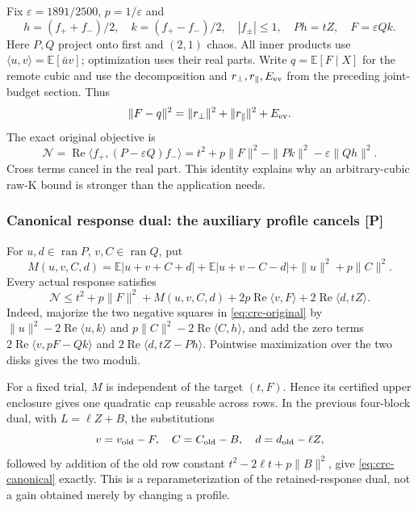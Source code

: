 Fix $\varepsilon=1891/2500$, $p=1/\varepsilon$ and
\[
 h=(f_++f_-)/2,\quad k=(f_+-f_-)/2,\quad |f_\pm|\le1,
 \quad Ph=tZ,\quad F=\varepsilon Qk.
\]
Here $P,Q$ project onto first and $(2,1)$ chaos. All inner products use
$\langle u,v\rangle=\mathbb E[\bar u v]$; optimization uses their real parts.
Write $q=\mathbb E[F\mid X]$ for the remote cubic and use the decomposition
and $r_\perp,r_\parallel,E_{\rm ev}$ from the preceding joint-budget section.
Thus
\[
 \|F-q\|^2=\|r_\perp\|^2+\|r_\parallel\|^2+E_{\rm ev}.
\]
The exact original objective is
\begin{equation}\label{eq:crc-original}
 \mathcal N=\operatorname{Re}\langle f_+,(P-\varepsilon Q)f_-\rangle
 =t^2+p\|F\|^2-\|Pk\|^2-\varepsilon\|Qh\|^2.
\end{equation}
Cross terms cancel in the real part. This identity explains why an
arbitrary-cubic raw-K bound is stronger than the application needs.

\subsubsection{Canonical response dual: the auxiliary profile cancels [P]}
For $u,d\in\operatorname{ran}P$, $v,C\in\operatorname{ran}Q$, put
\[
 M(u,v,C,d)=\mathbb E|u+v+C+d|+\mathbb E|u+v-C-d|
                 +\|u\|^2+p\|C\|^2.
\]
Every actual response satisfies
\begin{equation}\label{eq:crc-canonical}
 \boxed{\mathcal N\le t^2+p\|F\|^2+M(u,v,C,d)
       +2p\operatorname{Re}\langle v,F\rangle
       +2\operatorname{Re}\langle d,tZ\rangle.}
\end{equation}
Indeed, majorize the two negative squares in \eqref{eq:crc-original} by
$\|u\|^2-2\operatorname{Re}\langle u,k\rangle$ and
$p\|C\|^2-2\operatorname{Re}\langle C,h\rangle$, and add the zero terms
$2\operatorname{Re}\langle v,pF-Qk\rangle$ and
$2\operatorname{Re}\langle d,tZ-Ph\rangle$.
Pointwise maximization over the two disks gives the two moduli.

For a fixed trial, $M$ is independent of the target $(t,F)$. Hence its
certified upper enclosure gives one quadratic cap reusable across rows.
In the previous four-block dual, with $L=\ell Z+B$, the substitutions
\[
 v=v_{\rm old}-F,\quad C=C_{\rm old}-B,
 \quad d=d_{\rm old}-\ell Z,
\]
followed by addition of the old row constant
$t^2-2\ell t+p\|B\|^2$, give \eqref{eq:crc-canonical} exactly.
This is a reparameterization of the retained-response dual, not a gain
obtained merely by changing a profile.

